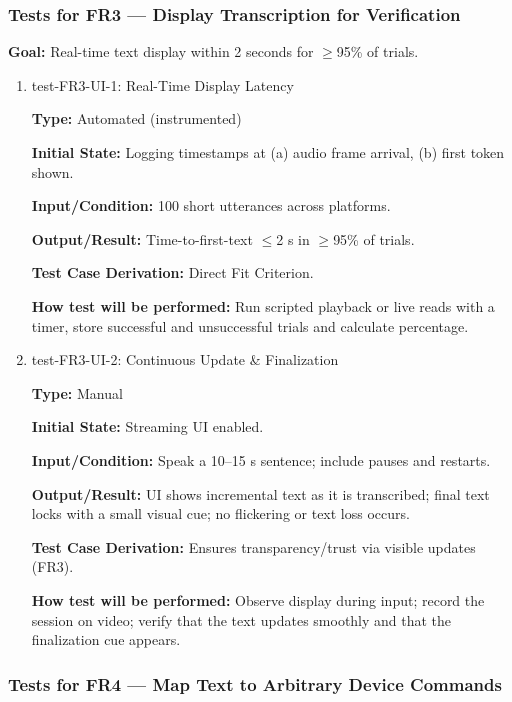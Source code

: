 \documentclass[12pt, titlepage]{article}
\begin{document}
\subsubsection{Tests for FR3 — Display Transcription for Verification}


\textbf{Goal:} Real-time text display within 2 seconds for $\geq$95\% of trials.


\begin{enumerate}

\item{test-FR3-UI-1: Real-Time Display Latency\\}

\textbf{Type:} Automated (instrumented)

\textbf{Initial State:} Logging timestamps at (a) audio frame arrival, (b) first token shown.

\textbf{Input/Condition:} 100 short utterances across platforms.

\textbf{Output/Result:} Time-to-first-text $\leq$2 s in $\geq$95\% of trials.

\textbf{Test Case Derivation:} Direct Fit Criterion.

\textbf{How test will be performed:} Run scripted playback or live reads with a timer, store successful and unsuccessful trials and calculate percentage.

\item{test-FR3-UI-2: Continuous Update \& Finalization\\}

\textbf{Type:} Manual

\textbf{Initial State:} Streaming UI enabled.

\textbf{Input/Condition:} Speak a 10--15 s sentence; include pauses and restarts.

\textbf{Output/Result:} UI shows incremental text as it is transcribed; final text locks with a small visual cue; no flickering or text loss occurs.

\textbf{Test Case Derivation:} Ensures transparency/trust via visible updates (FR3).

\textbf{How test will be performed:} Observe display during input; record the session on video; verify that the text updates smoothly and that the finalization cue appears.

\end{enumerate}

\subsubsection{Tests for FR4 — Map Text to Arbitrary Device Commands}
\end{document}
